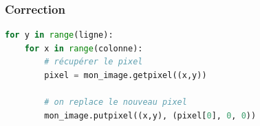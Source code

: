\documentclass[svgnames,11pt]{beamer}
\begin{document}
\begin{frame}[fragile]
    \frametitle{Correction}

\begin{center}
\begin{lstlisting}[language=Python , basicstyle=\ttfamily\small, xleftmargin=1em, xrightmargin=1em]
for y in range(ligne):
    for x in range(colonne):
        # récupérer le pixel
        pixel = mon_image.getpixel((x,y))

        # on replace le nouveau pixel
        mon_image.putpixel((x,y), (pixel[0], 0, 0))
\end{lstlisting}
\label{CODE}
\end{center}

\end{frame}
\end{document}
